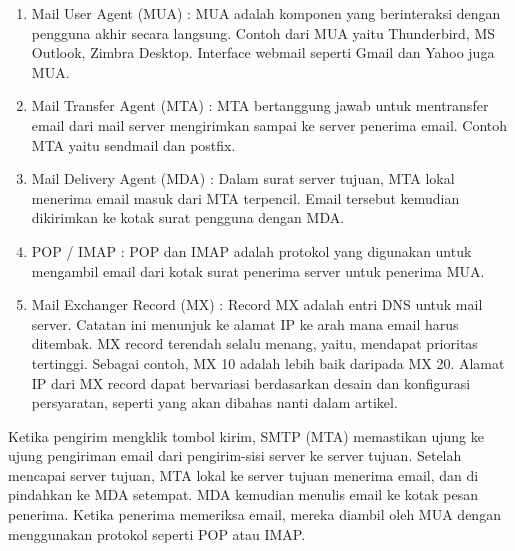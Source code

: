 \begin{enumerate}
\item Mail User Agent (MUA) : MUA adalah komponen yang berinteraksi dengan pengguna akhir secara langsung. Contoh dari MUA yaitu Thunderbird, MS Outlook, Zimbra Desktop. Interface webmail seperti Gmail dan Yahoo juga MUA. \par
\noindent 
\item Mail Transfer Agent (MTA) : MTA bertanggung jawab untuk mentransfer email dari mail server mengirimkan sampai ke server penerima email. Contoh MTA yaitu sendmail dan postfix. \par
\noindent 
\item Mail Delivery Agent (MDA) : Dalam surat server tujuan, MTA lokal menerima email masuk dari MTA terpencil. Email tersebut kemudian dikirimkan ke kotak surat pengguna dengan MDA. \par
\noindent 
\item POP / IMAP : POP dan IMAP adalah protokol yang digunakan untuk mengambil email dari kotak surat penerima server untuk penerima MUA. \par
\noindent 
\item Mail Exchanger Record (MX) : Record MX adalah entri DNS untuk mail server. Catatan ini menunjuk ke alamat IP ke arah mana email harus ditembak. MX record terendah selalu menang, yaitu, mendapat prioritas tertinggi. Sebagai contoh, MX 10 adalah lebih baik daripada MX 20. Alamat IP dari MX record dapat bervariasi berdasarkan desain dan konfigurasi persyaratan, seperti yang akan dibahas nanti dalam artikel.\end{enumerate}
 \par
Ketika pengirim mengklik tombol kirim, SMTP (MTA) memastikan ujung ke ujung pengiriman email dari pengirim-sisi server ke server tujuan. Setelah mencapai server tujuan, MTA lokal ke server tujuan menerima email, dan di pindahkan ke MDA setempat. MDA kemudian menulis email ke kotak pesan penerima. Ketika penerima memeriksa email, mereka diambil oleh MUA dengan menggunakan protokol seperti POP atau IMAP. \par
\vspace{12pt}
\vspace{12pt}

